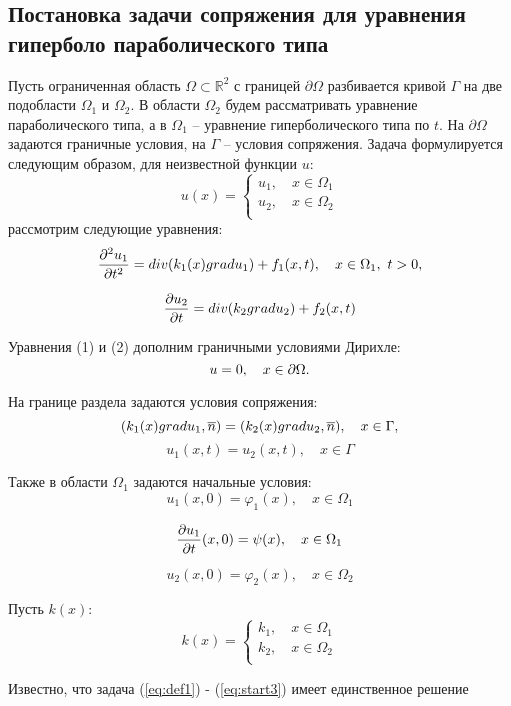 \subsection{Постановка задачи сопряжения для уравнения гиперболо параболического типа}
Пусть ограниченная область $\Omega \subset  \mathbb{R}^2 $ с границей $\partial \Omega$ разбивается кривой 
$\Gamma$ на две подобласти $\Omega_1$ и $\Omega_2$. В области $\Omega_2$ будем рассматривать уравнение параболического типа,
 а в $\Omega_1$ -- уравнение гиперболического типа по $t$. На $\partial \Omega$ задаются граничные условия, на $\Gamma$ -- условия сопряжения. Задача формулируется следующим образом, для неизвестной функции $u$:
$$
u(x) =
  \begin{cases}
    u_1, \quad x \in \Omega_1\\
    u_2, \quad x \in \Omega_2 \\
  \end{cases}
$$
рассмотрим следующие уравнения:
\begin{equation}
    {\frac{\partial^2 u_1}{\partial t^2}} = div(k_1(x)gradu_1) + f_1(x, t), \quad x \in \Omega_1,~t > 0,
    \label{eq:def1}
\end{equation}

\begin{equation}
    {\frac{\partial u_2}{\partial t}} = div(k_2gradu_2) + f_2(x, t)
    \label{eq:def2}
\end{equation}

Уравнения (1) и (2) дополним граничными условиями Дирихле:
\begin{equation}
     u = 0, \quad x \in {\partial \Omega}.
    \label{eq:dirichlet}
\end{equation}

На границе раздела задаются условия сопряжения:
\begin{equation}
    (k_1(x)gradu_1, \overline{n}) = (k_2(x)gradu_2, \overline{n}), \quad x \in \Gamma ,
    \label{eq:conjugation}
\end{equation}
$$ u_1(x,t) = u_2(x, t), \quad x \in \Gamma$$

Также в области $\Omega_1$ задаются начальные условия:
\begin{equation}
     u_1(x, 0) = \varphi_1(x), \quad x \in \Omega_1 
     \label{eq:start1}
\end{equation}

\begin{equation}
     {\frac{\partial u_1}{\partial t}}(x, 0) = \psi(x), \quad x \in \Omega_1 
     \label{eq:start2}
\end{equation}

\begin{equation}
     u_2(x, 0) = \varphi_2(x), \quad x \in \Omega_2
     \label{eq:start3}
\end{equation}

Пусть $k(x)$:
$$
k(x) =
  \begin{cases}
    k_1, \quad x \in \Omega_1\\
    k_2, \quad x \in \Omega_2 \\
  \end{cases}
$$

Известно, что задача (\ref{eq:def1}) -  (\ref{eq:start3}) имеет единственное решение 

